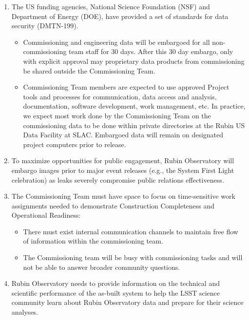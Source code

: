 \documentclass[SE,authoryear,toc,lsstdraft]{lsstdoc}
\begin{document}
\begin{enumerate}

  \item The US funding agencies, National Science Foundation (NSF) and Department of Energy (DOE), have provided a set of standards for data security (DMTN-199).

  \begin{itemize}

    \item Commissioning and engineering data will be embargoed for all non-commissioning team staff for 30 days.
    After this 30 day embargo, only with explicit approval may proprietary data products from commissioning be shared outside the Commissioning Team.

    \item Commissioning Team members are expected to use approved Project tools and processes for communication, data access and analysis, documentation, software development, work management, etc.
    In practice, we expect most work done by the Commissioning Team on the commissioning data to be done within private directories at the Rubin US Data Facility at SLAC.
    Embargoed data will remain on designated project computers prior to release.

  \end{itemize}

  \item To maximize opportunities for public engagement, Rubin Observatory will embargo images prior to major event releases (e.g., the System First Light celebration) as leaks severely compromise public relations effectiveness.

  \item The Commissioning Team must have space to focus on time-sensitive work assignments needed to demonstrate Construction Completeness and Operational Readiness:

  \begin{itemize}

    \item There must exist internal communication channels to maintain free flow of information within the commissioning team.

    \item The Commissioning team will be busy with commissioning tasks and will not be able to answer broader community questions.

  \end{itemize}

  \item Rubin Observatory needs to provide information on the technical and scientific performance of the as-built system to help the LSST science community learn about Rubin Observatory data and prepare for their science analyses.

\end{enumerate}
\end{document}
